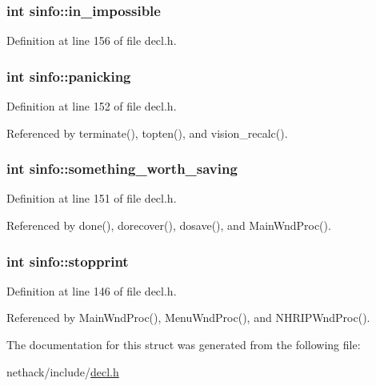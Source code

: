 \hypertarget{structsinfo_ab3434c44155e413a2e3c2a35d3397bdc}{
\subsubsection[{in\+\_\+impossible}]{\setlength{\rightskip}{0pt plus 5cm}int sinfo\+::in\+\_\+impossible}}\label{structsinfo_ab3434c44155e413a2e3c2a35d3397bdc}


Definition at line 156 of file decl.\+h.

\hypertarget{structsinfo_abf3b0c7bbd74f57595e53ab0eadd30e9}{
\subsubsection[{panicking}]{\setlength{\rightskip}{0pt plus 5cm}int sinfo\+::panicking}}\label{structsinfo_abf3b0c7bbd74f57595e53ab0eadd30e9}


Definition at line 152 of file decl.\+h.



Referenced by terminate(), topten(), and vision\+\_\+recalc().

\hypertarget{structsinfo_ae213176cfedea7945c371048e57e2931}{
\subsubsection[{something\+\_\+worth\+\_\+saving}]{\setlength{\rightskip}{0pt plus 5cm}int sinfo\+::something\+\_\+worth\+\_\+saving}}\label{structsinfo_ae213176cfedea7945c371048e57e2931}


Definition at line 151 of file decl.\+h.



Referenced by done(), dorecover(), dosave(), and Main\+Wnd\+Proc().

\hypertarget{structsinfo_a722956debc5ac939d455ba63e60fd963}{
\subsubsection[{stopprint}]{\setlength{\rightskip}{0pt plus 5cm}int sinfo\+::stopprint}}\label{structsinfo_a722956debc5ac939d455ba63e60fd963}


Definition at line 146 of file decl.\+h.



Referenced by Main\+Wnd\+Proc(), Menu\+Wnd\+Proc(), and N\+H\+R\+I\+P\+Wnd\+Proc().



The documentation for this struct was generated from the following file\+:\begin{DoxyCompactItemize}
\item 
nethack/include/\hyperlink{decl_8h}{decl.\+h}\end{DoxyCompactItemize}
